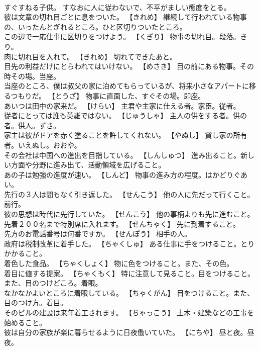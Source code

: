 \documentclass[8pt]{extreport}
\begin{document}
\begin{CJK}{UTF8}{min}
\\	すぐすねる子供。	すなおに人に従わないで、不平がましい態度をとる。
\\	彼は文章の切れ目ごとに息をついた。	【きれめ】 継続して行われている物事の、いったんとぎれるところ。ひと区切りついたところ。
\\	この辺で一応仕事に区切りをつけよう。	【くぎり】 物事の切れ目。段落。きり。
\\	肉に切れ目を入れて。	【きれめ】 切れてできたあと。
\\	目先の利益だけにとらわれてはいけない。	【めさき】 目の前にある物事。その時その場。当座。
\\	当座のところ、僕は叔父の家に泊めてもらっているが、将来小さなアパートに移るつもりだ。	【とうざ】 物事に直面した、すぐその場。即座。
\\	あいつは田中の家来だ。	【けらい】 主君や主家に仕える者。家臣。従者。
\\	従者にとっては誰も英雄ではない。	【じゅうしゃ】 主人の供をする者。供の者。供人。ずさ。
\\	家主は彼がドアを赤く塗ることを許してくれない。	【やぬし】 貸し家の所有者。いえぬし。おおや。
\\	その会社は中国への進出を目指している。	【しんしゅつ】 進み出ること。新しい方面や分野に進み出て、活動領域を広げること。
\\	あの子は勉強の進度が速い。	【しんど】 物事の進み方の程度。はかどりぐあい。
\\	先行の３人は間もなく引き返した。	【せんこう】 他の人に先だって行くこと。前行。
\\	彼の思想は時代に先行していた。	【せんこう】 他の事柄よりも先に進むこと。
\\	先着２００名まで特別席に入れます。	【せんちゃく】 先に到着すること。
\\	先方のお電話番号は何番ですか。	【せんぽう】 相手の人。
\\	政府は税制改革に着手した。	【ちゃくしゅ】 ある仕事に手をつけること。とりかかること。
\\	着色した食品。	【ちゃくしょく】 物に色をつけること。また、その色。
\\	着目に値する提案。	【ちゃくもく】 特に注意して見ること。目をつけること。また、目のつけどころ。着眼。
\\	なかなかよいところに着眼している。	【ちゃくがん】 目をつけること。また、目のつけ方。着目。
\\	そのビルの建設は来年着工されます。	【ちゃっこう】 土木・建築などの工事を始めること。
\\	彼は自分の家族が楽に暮らせるように日夜働いていた。	【にちや】 昼と夜。昼夜。

\end{CJK}
\end{document}

